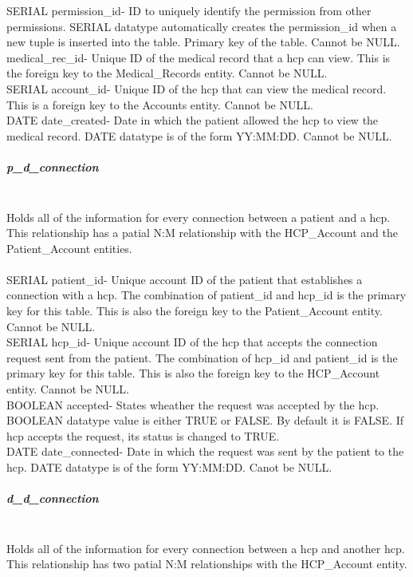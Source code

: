 \documentclass[12pt]{report}
\begin{document}
SERIAL permission_id-  ID to uniquely identify the permission from other permissions. SERIAL datatype automatically creates the permission_id when a new tuple is inserted into the table.  Primary key of the table.  Cannot be NULL.\\

medical_rec_id- Unique ID of the medical record that a hcp can view.  This is the foreign key to the Medical_Records entity.  Cannot be NULL.\\   

SERIAL account_id- Unique ID of the hcp that can view the medical record.  This is a foreign key to the Accounts entity.  Cannot be NULL.\\

DATE date_created-  Date in which the patient allowed the hcp to view the medical record.  DATE datatype is of the form YY:MM:DD.  Cannot be NULL.\\

\subparagraph{p_d_connection}\\
Holds all of the information for every connection between a patient and a hcp.  This relationship has a patial N:M relationship with the HCP_Account and the Patient_Account entities.\\ \\

SERIAL patient_id- Unique account ID of the patient that establishes a connection with a hcp.  The combination of patient_id and hcp_id is the primary key for this table.  This is also the foreign key to the Patient_Account entity.  Cannot be NULL.\\  

SERIAL hcp_id- Unique account ID of the hcp that accepts the connection request sent from the patient.  The combination of hcp_id and patient_id is the primary key for this table.  This is also the foreign key to the HCP_Account entity.  Cannot be NULL.\\

BOOLEAN accepted- States wheather the request was accepted by the hcp.  BOOLEAN datatype value is either TRUE or FALSE.  By default it is FALSE.  If hcp accepts the request, its status is changed to TRUE.\\

DATE date_connected- Date in which the request was sent by the patient to the hcp.  DATE datatype is of the form YY:MM:DD.  Canot be NULL.\\

\subparagraph{d_d_connection}\\
Holds all of the information for every connection between a hcp and another hcp.  This relationship has two patial N:M relationships with the HCP_Account entity.\\ \\
\end{document}

